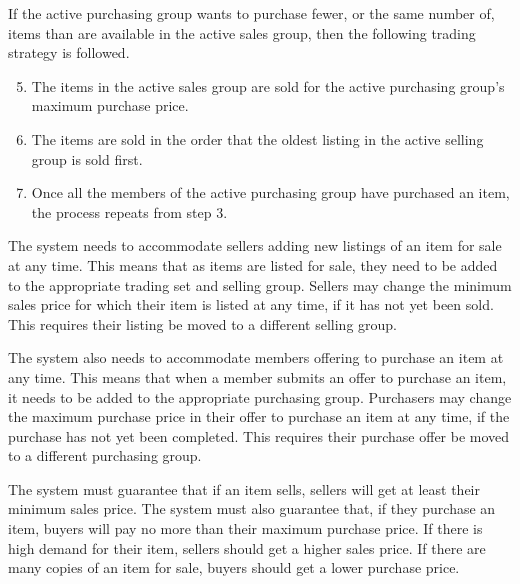 \documentclass{csse4400}
\begin{document}
If the active purchasing group wants to purchase fewer, or the same number of, items than are available in the active sales group, then the following trading strategy is followed.
\begin{enumerate}
	\setcounter{enumi}{4}
	\item The items in the active sales group are sold for the active purchasing group's maximum purchase price.
	\item The items are sold in the order that the oldest listing in the active selling group is sold first.
	\item Once all the members of the active purchasing group have purchased an item, the process repeats from step 3.
\end{enumerate}

The system needs to accommodate sellers adding new listings of an item for sale at any time.
This means that as items are listed for sale, they need to be added to the appropriate trading set and selling group.
Sellers may change the minimum sales price for which their item is listed at any time, if it has not yet been sold.
This requires their listing be moved to a different selling group.

The system also needs to accommodate members offering to purchase an item at any time.
This means that when a member submits an offer to purchase an item, it needs to be added to the appropriate purchasing group.
Purchasers may change the maximum purchase price in their offer to purchase an item at any time,
if the purchase has not yet been completed.
This requires their purchase offer be moved to a different purchasing group.

The system must guarantee that if an item sells, sellers will get at least their minimum sales price.
The system must also guarantee that, if they purchase an item, buyers will pay no more than their maximum purchase price.
If there is high demand for their item, sellers should get a higher sales price.
If there are many copies of an item for sale, buyers should get a lower purchase price.
\end{document}

